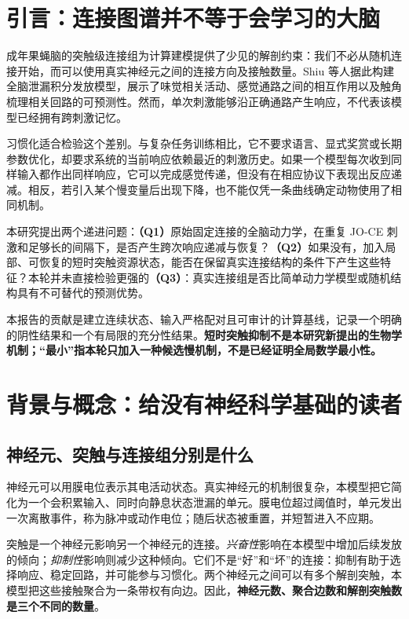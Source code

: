 \section{引言：连接图谱并不等于会学习的大脑}
\label{sec:intro}
成年果蝇脑的突触级连接组为计算建模提供了少见的解剖约束：我们不必从随机连接开始，而可以使用真实神经元之间的连接方向及接触数量\citep{dorkenwald2024}。Shiu 等人据此构建全脑泄漏积分发放模型，展示了味觉相关活动、感觉通路之间的相互作用以及触角梳理相关回路的可预测性\citep{shiu2024}。然而，单次刺激能够沿正确通路产生响应，不代表该模型已经拥有跨刺激记忆。

习惯化适合检验这个差别。与复杂任务训练相比，它不要求语言、显式奖赏或长期参数优化，却要求系统的当前响应依赖最近的刺激历史\citep{rankin2009}。如果一个模型每次收到同样输入都作出同样响应，它可以完成感觉传递，但没有在相应协议下表现出反应递减。相反，若引入某个慢变量后出现下降，也不能仅凭一条曲线确定动物使用了相同机制。

本研究提出两个递进问题：\textbf{（Q1）}原始固定连接的全脑动力学，在重复 JO-CE 刺激和足够长的间隔下，是否产生跨次响应递减与恢复？\textbf{（Q2）}如果没有，加入局部、可恢复的短时突触资源状态，能否在保留真实连接结构的条件下产生这些特征？本轮并未直接检验更强的\textbf{（Q3）}：真实连接组是否比简单动力学模型或随机结构具有不可替代的预测优势。

本报告的贡献是建立连续状态、输入严格配对且可审计的计算基线，记录一个明确的阴性结果和一个有局限的充分性结果。\textbf{短时突触抑制不是本研究新提出的生物学机制；“最小”指本轮只加入一种候选慢机制，不是已经证明全局数学最小性。}

\section{背景与概念：给没有神经科学基础的读者}
\label{sec:background}
\subsection{神经元、突触与连接组分别是什么}
神经元可以用膜电位表示其电活动状态。真实神经元的机制很复杂，本模型把它简化为一个会积累输入、同时向静息状态泄漏的单元。膜电位超过阈值时，单元发出一次离散事件，称为脉冲或动作电位；随后状态被重置，并短暂进入不应期。

突触是一个神经元影响另一个神经元的连接。\emph{兴奋性}影响在本模型中增加后续发放的倾向；\emph{抑制性}影响则减少这种倾向。它们不是“好”和“坏”的连接：抑制有助于选择响应、稳定回路，并可能参与习惯化。两个神经元之间可以有多个解剖突触，本模型把这些接触聚合为一条带权有向边。因此，\textbf{神经元数、聚合边数和解剖突触数是三个不同的数量}。

